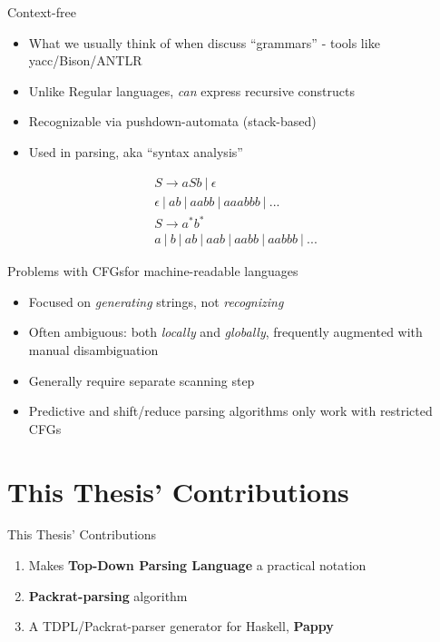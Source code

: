 \documentclass{beamer}
\begin{document}
\begin{frame}{Context-free}
  \begin{itemize}
    \item What we usually think of when discuss ``grammars'' - tools
      like yacc/Bison/ANTLR
    \item Unlike Regular languages, \textit{can} express recursive
      constructs
    \item Recognizable via pushdown-automata (stack-based)
    \item Used in parsing, aka ``syntax analysis''
  \end{itemize}
  \begin{gather}
    S \rightarrow aSb ~|~ \epsilon \\
    \epsilon~|~ab~|~aabb~|~aaabbb~|~... \\
    S \rightarrow a^* b^* \\
    a~|~b~|~ab~|~aab~|~aabb~|~aabbb~|~...
  \end{gather}
\end{frame}

\begin{frame}{Problems with CFGs}{for machine-readable languages}
  \begin{itemize}
    \item Focused on \textit{generating} strings, not \textit{recognizing}
    \item Often ambiguous: both \textit{locally} and \textit{globally},
      frequently augmented with manual disambiguation
    \item Generally require separate scanning step
    \item Predictive and shift/reduce parsing algorithms only work
      with restricted CFGs
  \end{itemize}
\end{frame}

\section[Contributions]{This Thesis' Contributions}
\begin{frame}{This Thesis' Contributions}
  \begin{enumerate}
    \item Makes \textbf{Top-Down Parsing Language} a practical notation
    \item \textbf{Packrat-parsing} algorithm
    \item A TDPL/Packrat-parser generator for Haskell, \textbf{Pappy}
  \end{enumerate}
\end{frame}
\end{document}
